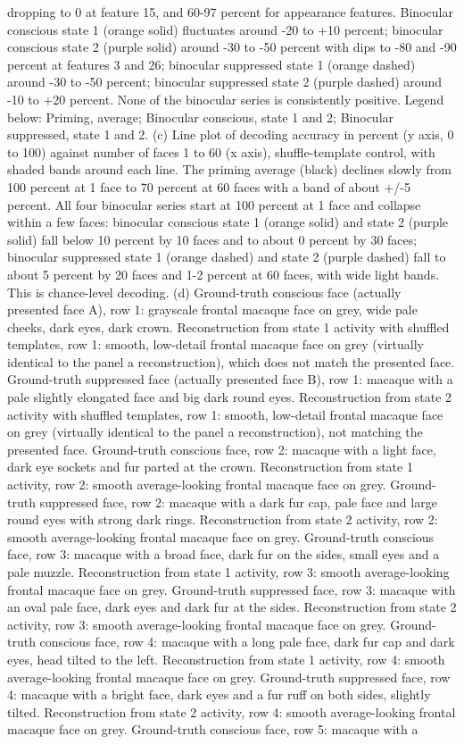 \documentclass{article}
\begin{document}
dropping to 0 at feature 15, and 60-97 percent for appearance features. Binocular conscious state 1 (orange solid) fluctuates around -20 to +10 percent; binocular conscious state 2 (purple solid) around -30 to -50 percent with dips to -80 and -90 percent at features 3 and 26; binocular suppressed state 1 (orange dashed) around -30 to -50 percent; binocular suppressed state 2 (purple dashed) around -10 to +20 percent. None of the binocular series is consistently positive. Legend below: Priming, average; Binocular conscious, state 1 and 2; Binocular suppressed, state 1 and 2. (c) Line plot of decoding accuracy in percent (y axis, 0 to 100) against number of faces 1 to 60 (x axis), shuffle-template control, with shaded bands around each line. The priming average (black) declines slowly from 100 percent at 1 face to 70 percent at 60 faces with a band of about +/-5 percent. All four binocular series start at 100 percent at 1 face and collapse within a few faces: binocular conscious state 1 (orange solid) and state 2 (purple solid) fall below 10 percent by 10 faces and to about 0 percent by 30 faces; binocular suppressed state 1 (orange dashed) and state 2 (purple dashed) fall to about 5 percent by 20 faces and 1-2 percent at 60 faces, with wide light bands. This is chance-level decoding. (d) Ground-truth conscious face (actually presented face A), row 1: grayscale frontal macaque face on grey, wide pale cheeks, dark eyes, dark crown. Reconstruction from state 1 activity with shuffled templates, row 1: smooth, low-detail frontal macaque face on grey (virtually identical to the panel a reconstruction), which does not match the presented face. Ground-truth suppressed face (actually presented face B), row 1: macaque with a pale slightly elongated face and big dark round eyes. Reconstruction from state 2 activity with shuffled templates, row 1: smooth, low-detail frontal macaque face on grey (virtually identical to the panel a reconstruction), not matching the presented face. Ground-truth conscious face, row 2: macaque with a light face, dark eye sockets and fur parted at the crown. Reconstruction from state 1 activity, row 2: smooth average-looking frontal macaque face on grey. Ground-truth suppressed face, row 2: macaque with a dark fur cap, pale face and large round eyes with strong dark rings. Reconstruction from state 2 activity, row 2: smooth average-looking frontal macaque face on grey. Ground-truth conscious face, row 3: macaque with a broad face, dark fur on the sides, small eyes and a pale muzzle. Reconstruction from state 1 activity, row 3: smooth average-looking frontal macaque face on grey. Ground-truth suppressed face, row 3: macaque with an oval pale face, dark eyes and dark fur at the sides. Reconstruction from state 2 activity, row 3: smooth average-looking frontal macaque face on grey. Ground-truth conscious face, row 4: macaque with a long pale face, dark fur cap and dark eyes, head tilted to the left. Reconstruction from state 1 activity, row 4: smooth average-looking frontal macaque face on grey. Ground-truth suppressed face, row 4: macaque with a bright face, dark eyes and a fur ruff on both sides, slightly tilted. Reconstruction from state 2 activity, row 4: smooth average-looking frontal macaque face on grey. Ground-truth conscious face, row 5: macaque with a 
\end{document}
